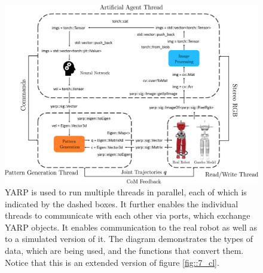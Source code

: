 \begin{figure}[h!]
	\hspace*{-1cm}
	\includegraphics[scale=.4]{chapters/06_implementation_of_the_walking_pattern_generator/img/yarp_diag.png}
	\caption{YARP is used to run multiple threads in parallel, each of which is indicated by the dashed boxes. It further enables the individual threads to communicate with each other via ports, which exchange YARP objects. It enables communication to the real robot as well as to a simulated version of it. The diagram demonstrates the types of data, which are being used, and the functions that convert them. Notice that this is an extended version of figure \ref{fig::7_cl}.}
	\label{fig::8_yarp}
\end{figure}
